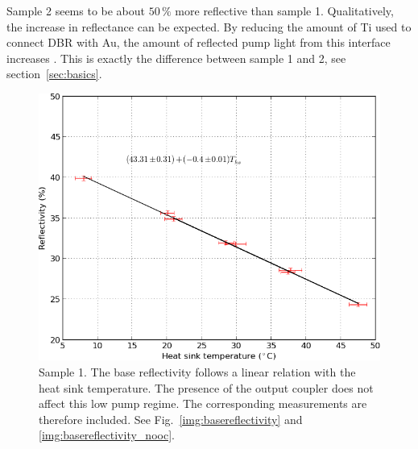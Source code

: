 Sample 2 seems to be about $50\,\%$
more reflective
than sample 1.
Qualitatively,
the increase in reflectance
can be expected.
By reducing the amount
of Ti used
to connect DBR with Au,
the amount of reflected pump light
from this interface
increases \cite{Hader2011}.
This is exactly the difference
between sample 1 and 2,
see section~\ref{sec:basics}.

\begin{figure}
\centering
\includegraphics[width=14.5cm]{img/basereflectivity_fit.png}
\caption{Sample 1.
The base reflectivity follows a linear relation
with the heat sink temperature.
The presence of the output coupler
does not affect this low pump regime.
The corresponding measurements
are therefore included.
See Fig.~\ref{img:basereflectivity}
and \ref{img:basereflectivity_nooc}.}
\label{img:basereflectivity_fit}
\end{figure}


